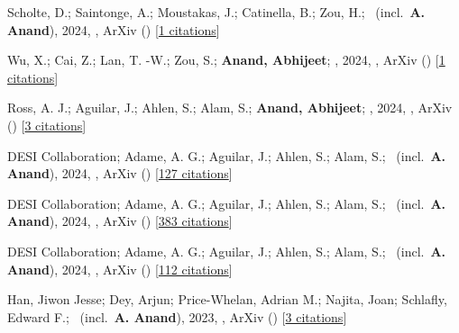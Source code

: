 \item[{\color{numcolor}\scriptsize7}] Scholte, D.; Saintonge, A.; Moustakas, J.; Catinella, B.; Zou, H.; \etal\ (incl.\ \textbf{A. Anand}), 2024, , ArXiv () [\href{https://ui.adsabs.harvard.edu/abs/2024arXiv240803996S}{1 citations}]

\item[{\color{numcolor}\scriptsize6}] Wu, X.; Cai, Z.; Lan, T. -W.; Zou, S.; \textbf{Anand, Abhijeet}; \etal, 2024, , ArXiv () [\href{https://ui.adsabs.harvard.edu/abs/2024arXiv240717809W}{1 citations}]

\item[{\color{numcolor}\scriptsize5}] Ross, A. J.; Aguilar, J.; Ahlen, S.; Alam, S.; \textbf{Anand, Abhijeet}; \etal, 2024, , ArXiv () [\href{https://ui.adsabs.harvard.edu/abs/2024arXiv240516593R}{3 citations}]

\item[{\color{numcolor}\scriptsize4}] DESI Collaboration; Adame, A. G.; Aguilar, J.; Ahlen, S.; Alam, S.; \etal\ (incl.\ \textbf{A. Anand}), 2024, , ArXiv () [\href{https://ui.adsabs.harvard.edu/abs/2024arXiv240403000D}{127 citations}]

\item[{\color{numcolor}\scriptsize3}] DESI Collaboration; Adame, A. G.; Aguilar, J.; Ahlen, S.; Alam, S.; \etal\ (incl.\ \textbf{A. Anand}), 2024, , ArXiv () [\href{https://ui.adsabs.harvard.edu/abs/2024arXiv240403002D}{383 citations}]

\item[{\color{numcolor}\scriptsize2}] DESI Collaboration; Adame, A. G.; Aguilar, J.; Ahlen, S.; Alam, S.; \etal\ (incl.\ \textbf{A. Anand}), 2024, , ArXiv () [\href{https://ui.adsabs.harvard.edu/abs/2024arXiv240403001D}{112 citations}]

\item[{\color{numcolor}\scriptsize1}] Han, Jiwon Jesse; Dey, Arjun; Price-Whelan, Adrian M.; Najita, Joan; Schlafly, Edward F.; \etal\ (incl.\ \textbf{A. Anand}), 2023, , ArXiv () [\href{https://ui.adsabs.harvard.edu/abs/2023arXiv230611784H}{3 citations}]